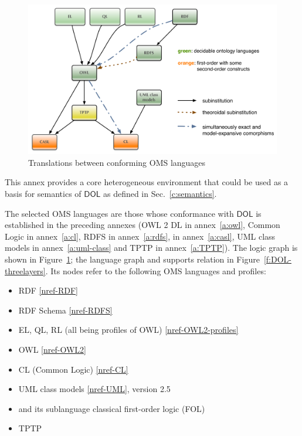 \documentclass[10pt, a4paper]{isov2}
\newcommand*{\DOL}{\ensuremath{\mathsf{DOL}}\xspace}
\renewcommand{\annexrefname}{annex}
\renewcommand{\figurerefname}{Figure}
\renewcommand{\noterefname}{note}
\renewcommand{\aref}[1]{\annexrefname~\ref{#1}}
\renewcommand{\fref}[1]{\figurerefname~\ref{#1}}
\renewcommand{\nref}[1]{\noterefname~\ref{#1}}
\renewcommand{\nref}[1]{\ref{nref-#1}}
\begin{document}
\begin{figure}
  \centering
  \includegraphics[width=\textwidth]{illustrations/ontograph-standards-new}
  \caption{Translations between conforming OMS languages}
  \label{fig:ontograph-standards}
\end{figure}

This annex provides a core heterogeneous environment that could be used as a basis for 
semantics of \DOL as defined in Sec.~\ref{c:semantics}.



 
The selected OMS languages are those whose conformance with \DOL is
established in the preceding annexes (OWL 2 DL in \aref{a:owl}, Common
Logic in \aref{a:cl}, RDFS in \aref{a:rdfs}, \CASL in \aref{a:casl}, UML
class models in \aref{a:uml-class} and TPTP in \aref{a:TPTP}).  The
logic graph is shown in \fref{fig:ontograph-standards}; the language
graph and supports relation in \fref{f:DOL-threelayers}.  Its nodes
refer to the following OMS languages and profiles:
\begin{itemize}
\item RDF \nref{RDF}
\item RDF Schema \nref{RDFS}
\item EL, QL, RL (all being profiles of OWL) \nref{OWL2-profiles}
\item OWL \nref{OWL2}
\item CL (Common Logic) \nref{CL}
\item UML class models \nref{UML}, version 2.5
\item \CASL \cite{CASL-RM} and its sublanguage classical first-order logic (FOL)
\item TPTP
\end{itemize}
\end{document}
